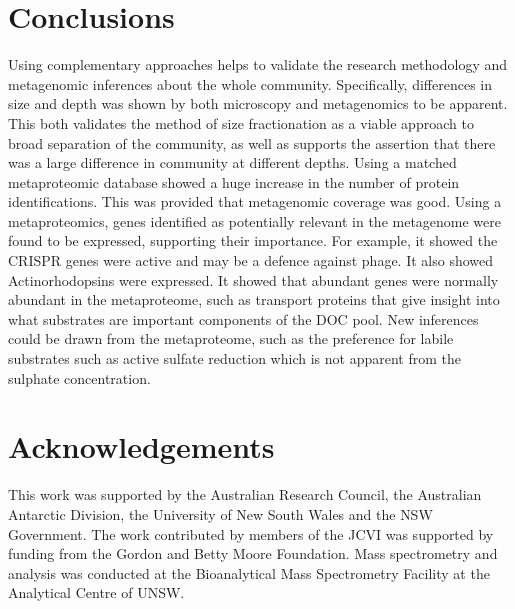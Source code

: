 \section{Conclusions}
Using complementary approaches helps to validate the research methodology and 
metagenomic inferences about the whole community.
Specifically, differences in size and depth was shown by both microscopy and metagenomics to be apparent.
This both validates the method of size fractionation as a viable approach to broad separation of the community,
as well as supports the assertion that there was a large difference in community at different depths.
Using a matched metaproteomic database showed a huge increase in the number of protein identifications.
This was provided that metagenomic coverage was good.
Using a metaproteomics, genes identified as potentially relevant in the metagenome were found to be expressed, supporting their importance.
For example, it showed the \ac{CRISPR} genes were active and may be a defence against phage.
It also showed Actinorhodopsins were expressed.
It showed that abundant genes were normally abundant in the metaproteome, such as transport proteins that give insight into what substrates are important components of the \ac{DOC} pool.
New inferences could be drawn from the metaproteome, such as the preference for labile substrates such as active sulfate reduction which is not apparent from the sulphate concentration.



\section{Acknowledgements}
This work was supported by the Australian Research Council, the Australian Antarctic Division, the University of New South Wales and the \textsc{NSW} Government. 
The work contributed by members of the \ac{JCVI} was supported by funding from the Gordon and Betty Moore Foundation.
Mass spectrometry and analysis was conducted at the Bioanalytical Mass Spectrometry Facility at the Analytical Centre of \textsc{UNSW}.
